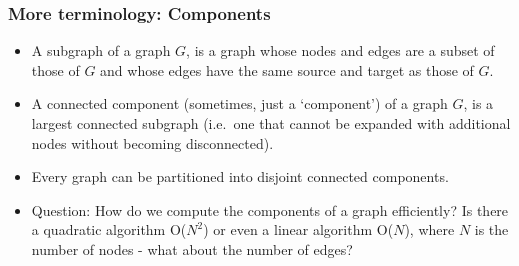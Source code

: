    \begin{frame}[fragile]
\frametitle{More terminology: Components}

\begin{itemize}
\item A \color{blue}subgraph \color{black} of a graph $G$, is a graph whose nodes and edges are a subset of those of 
$G$ and whose edges have the same source and target as those of $G$.

\item A \color{blue}connected component \color{black} (sometimes, just a `component') of a graph $G$, is a largest
connected subgraph (i.e.~one that cannot be expanded with additional nodes without 
becoming disconnected).

\item Every graph can be partitioned into disjoint connected components. 

\item \color{blue}Question\color{black}: How do we compute the components of a graph efficiently? Is there a quadratic algorithm O($N^2$) or even a linear algorithm O($N$), where $N$ is the number of nodes - what about the number of edges?
\end{itemize}

\end{frame}
%
%
%

